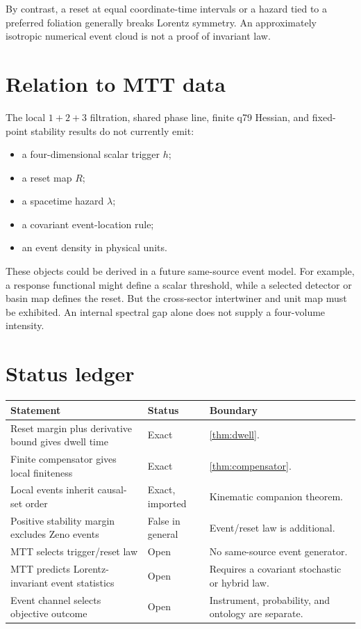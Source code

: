 \documentclass[11pt]{article}
\theoremstyle{definition}
\theoremstyle{remark}
\begin{document}
By contrast, a reset at equal coordinate-time intervals or a hazard tied to
a preferred foliation generally breaks Lorentz symmetry. An approximately
isotropic numerical event cloud is not a proof of invariant law.

\section{Relation to MTT data}

The local \(1+2+3\) filtration, shared phase line, finite q79 Hessian, and
fixed-point stability results do not currently emit:
\begin{itemize}
\item a four-dimensional scalar trigger \(h\);
\item a reset map \(R\);
\item a spacetime hazard \(\lambda\);
\item a covariant event-location rule;
\item an event density in physical units.
\end{itemize}

These objects could be derived in a future same-source event model. For
example, a response functional might define a scalar threshold, while a
selected detector or basin map defines the reset. But the cross-sector
intertwiner and unit map must be exhibited. An internal spectral gap alone
does not supply a four-volume intensity.

\section{Status ledger}

\begin{center}
\begin{tabularx}{\textwidth}{@{}
>{\raggedright\arraybackslash}p{}
>{\raggedright\arraybackslash}p{}
>{\raggedright\arraybackslash}X@{}}
\toprule
Statement & Status & Boundary\\
\midrule
Reset margin plus derivative bound gives dwell time & Exact &
\autoref{thm:dwell}.\\
Finite compensator gives local finiteness & Exact &
\autoref{thm:compensator}.\\
Local events inherit causal-set order & Exact, imported &
Kinematic companion theorem.\\
Positive stability margin excludes Zeno events & False in general &
Event/reset law is additional.\\
MTT selects trigger/reset law & Open &
No same-source event generator.\\
MTT predicts Lorentz-invariant event statistics & Open &
Requires a covariant stochastic or hybrid law.\\
Event channel selects objective outcome & Open &
Instrument, probability, and ontology are separate.\\
\bottomrule
\end{tabularx}
\end{center}
\end{document}
